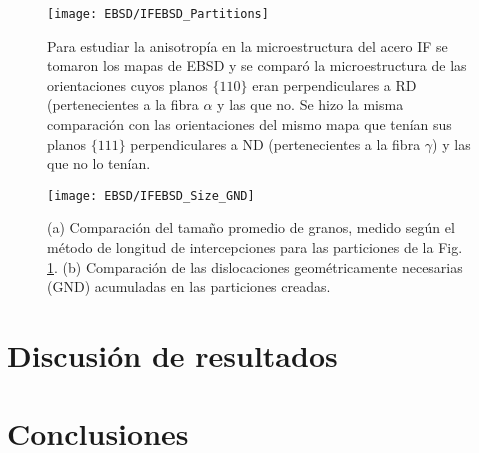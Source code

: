 \begin{figure}[!htb]
  \centering
  \texttt{[image: EBSD/IFEBSD\_Partitions]}
  \caption{Para estudiar la anisotropía en la microestructura del acero IF se tomaron los mapas de EBSD y se comparó la microestructura de las orientaciones cuyos planos $\{110\}$ eran perpendiculares a RD (pertenecientes a la fibra $\alpha$ y las que no. Se hizo la misma comparación con las orientaciones del mismo mapa que tenían sus planos $\{111\}$ perpendiculares a ND (pertenecientes a la fibra $\gamma$) y las que no lo tenían.}
  \label{fig:IFEBSDPar}
\end{figure}

\begin{figure}[!htb]
  \centering
  \texttt{[image: EBSD/IFEBSD\_Size\_GND]}
  \caption{(a) Comparación del tamaño promedio de granos, medido según el método de longitud de intercepciones para las particiones de la Fig. \ref{fig:IFEBSDPar}. (b) Comparación de las dislocaciones geométricamente necesarias (GND) acumuladas en las particiones creadas.}
  \label{fig:IFEBSDVs}
\end{figure}

\newpage
\section{Discusión de resultados}\label{S:IFDis}
\section{Conclusiones}\label{S:IFConclusiones}
